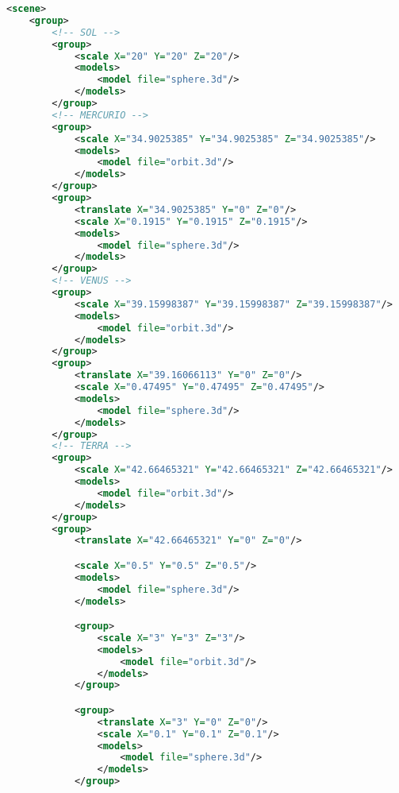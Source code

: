 \documentclass[a4paper]{article}
\begin{document}
\begin{lstlisting}[language=XML]
    <scene>
    <group>
        <!-- SOL -->
        <group>
            <scale X="20" Y="20" Z="20"/>
            <models>
                <model file="sphere.3d"/>
            </models>
        </group>
        <!-- MERCURIO -->
        <group>
            <scale X="34.9025385" Y="34.9025385" Z="34.9025385"/>
            <models>
                <model file="orbit.3d"/>
            </models>
        </group>
        <group>
            <translate X="34.9025385" Y="0" Z="0"/>
            <scale X="0.1915" Y="0.1915" Z="0.1915"/>
            <models>
                <model file="sphere.3d"/>
            </models>
        </group>
        <!-- VENUS -->
        <group>
            <scale X="39.15998387" Y="39.15998387" Z="39.15998387"/>
            <models>
                <model file="orbit.3d"/>
            </models>
        </group>
        <group>
            <translate X="39.16066113" Y="0" Z="0"/>
            <scale X="0.47495" Y="0.47495" Z="0.47495"/>
            <models>
                <model file="sphere.3d"/>
            </models>
        </group>
        <!-- TERRA -->
        <group>
            <scale X="42.66465321" Y="42.66465321" Z="42.66465321"/>
            <models>
                <model file="orbit.3d"/>
            </models>
        </group>
        <group>
            <translate X="42.66465321" Y="0" Z="0"/>

            <scale X="0.5" Y="0.5" Z="0.5"/>
            <models>
                <model file="sphere.3d"/>
            </models>

            <group>
                <scale X="3" Y="3" Z="3"/>
                <models>
                    <model file="orbit.3d"/>
                </models>
            </group>

            <group>
                <translate X="3" Y="0" Z="0"/>
                <scale X="0.1" Y="0.1" Z="0.1"/>
                <models>
                    <model file="sphere.3d"/>
                </models>
            </group>


\end{lstlisting}
\end{document}
